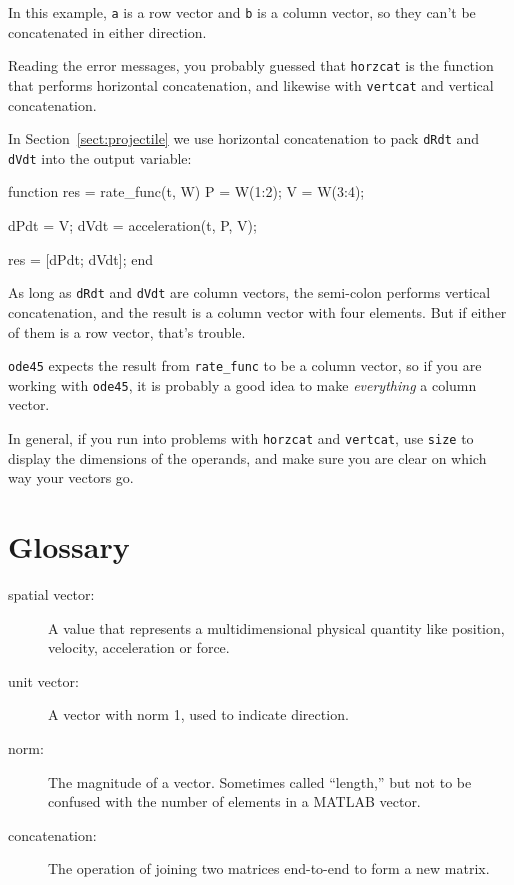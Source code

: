 \documentclass[
]{book}
\numberwithin{Answer}{chapter}
\numberwithin{Exercise}{chapter}
\begin{document}
In this example, {\tt a} is a row vector and {\tt b} is a column
vector, so they can't be concatenated in either direction.

Reading the error messages, you probably guessed that {\tt horzcat}
is the function that performs horizontal concatenation, and likewise
with {\tt vertcat} and vertical concatenation.


In Section~\ref{sect:projectile} we use horizontal concatenation to pack {\tt dRdt} and {\tt dVdt} into the output variable:

\begin{code}
function res = rate_func(t, W)
    P = W(1:2);
    V = W(3:4);

    dPdt = V;
    dVdt = acceleration(t, P, V);

    res = [dPdt; dVdt];
end
\end{code}

As long as {\tt dRdt} and {\tt dVdt} are column vectors,
the semi-colon performs vertical concatenation, and the result is
a column vector with four elements.  But if either of them is a
row vector, that's trouble.


{\tt ode45} expects the result from \verb"rate_func" to be a
column vector, so if you are working with {\tt ode45}, it is
probably a good idea to make {\em everything} a column vector.

In general, if you run into problems with {\tt horzcat} and
{\tt vertcat}, use {\tt size} to display the dimensions of the operands,
and make sure you are clear on which way your vectors go.


\section{Glossary}

\begin{description}

\item[spatial vector:] A value that represents a
multidimensional physical quantity like position, velocity,
acceleration or force.

\item[unit vector:] A vector with norm 1, used to indicate
direction.

\item[norm:] The magnitude of a vector.  Sometimes called ``length,''
but not to be confused with the number of elements in a MATLAB
vector.

\item[concatenation:] The operation of joining two matrices end-to-end to
form a new matrix.

\end{description}
\end{document}
